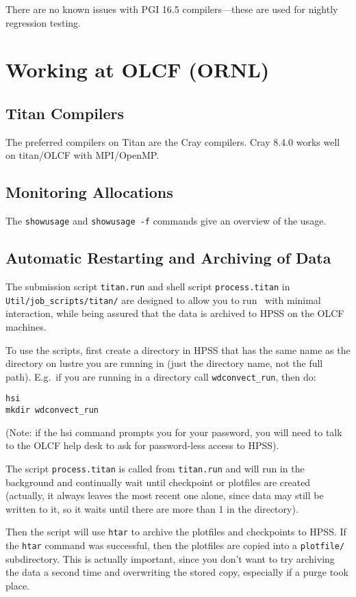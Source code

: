 There are no known issues with PGI 16.5 compilers---these are used
for nightly regression testing.


\section{Working at OLCF (ORNL)}

\subsection{Titan Compilers}

The preferred compilers on Titan are the Cray compilers.  
Cray 8.4.0 works well on titan/OLCF with MPI/OpenMP.


\subsection{Monitoring Allocations}

The {\tt showusage} and {\tt showusage -f} commands give an
overview of the usage.

\subsection{Automatic Restarting and Archiving of Data}

The submission script {\tt titan.run} and shell script
{\tt process.titan} in {\tt Util/job\_scripts/titan/}
are designed to allow you to run \maestro\ with minimal interaction,
while being assured that the data is archived to HPSS on the OLCF
machines.

To use the scripts, first create a directory in HPSS that has the same
name as the directory on lustre you are running in (just the directory
name, not the full path).  E.g.\ if you are running in a directory
call {\tt wdconvect\_run}, then do:
\begin{verbatim}
hsi
mkdir wdconvect_run
\end{verbatim}
(Note: if the hsi command prompts you for your password, you will need
to talk to the OLCF help desk to ask for password-less access to
HPSS).

The script {\tt process.titan} is called from {\tt titan.run} and will
run in the background and continually wait until checkpoint or
plotfiles are created (actually, it always leaves the most recent one
alone, since data may still be written to it, so it waits until there
are more than 1 in the directory).

Then the script will use {\tt htar} to archive the plotfiles and
checkpoints to HPSS.  If the {\tt htar} command was successful, then
the plotfiles are copied into a {\tt plotfile/} subdirectory.  This is
actually important, since you don't want to try archiving the data a
second time and overwriting the stored copy, especially if a purge
took place.

